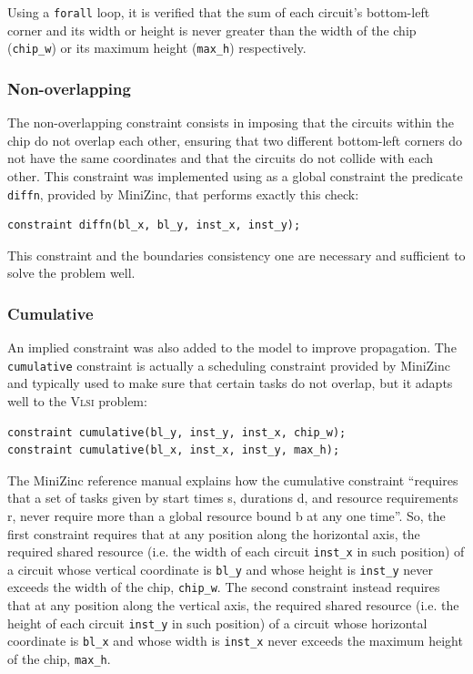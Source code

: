 \documentclass[a4paper, 12pt]{article}
\begin{document}
 Using a \verb|forall| loop, it is verified that the sum of each circuit's bottom-left corner and its width or height is never greater than the width of the chip (\verb|chip_w|) or its maximum height (\verb|max_h|) respectively.


\subsubsection{Non-overlapping}
The non-overlapping constraint consists in imposing that the circuits within the chip do not overlap each other, ensuring that two different bottom-left corners do not have the same coordinates and that the circuits do not collide with each other. This constraint was implemented using as a global constraint the predicate \verb|diffn|, provided by MiniZinc, that performs exactly this check:
\begin{verbatim}
constraint diffn(bl_x, bl_y, inst_x, inst_y);
 \end{verbatim}

This constraint and the boundaries consistency one are necessary and sufficient to solve the problem well.

\subsubsection{Cumulative}
An implied constraint was also added to the model to improve propagation. The \verb|cumulative| constraint is actually a scheduling constraint provided by MiniZinc and typically used to make sure that certain tasks do not overlap, but it adapts well to the \textsc{Vlsi} problem:
\begin{verbatim}
constraint cumulative(bl_y, inst_y, inst_x, chip_w);
constraint cumulative(bl_x, inst_x, inst_y, max_h);
 \end{verbatim}
 
The MiniZinc reference manual explains how the cumulative constraint ``requires that a set of tasks given by start times s, durations d, and resource requirements r, never require more than a global resource bound b at any one time''. So, the first constraint requires that at any position along the horizontal axis, the required shared resource (i.e. the width of each circuit \verb|inst_x| in such position) of a circuit whose vertical coordinate is \verb|bl_y| and whose height is \verb|inst_y| never exceeds the width of the chip, \verb|chip_w|. The second constraint instead requires that at any position along the vertical axis, the required shared resource (i.e. the height of each circuit \verb|inst_y| in such position) of a circuit whose horizontal coordinate is \verb|bl_x| and whose width is \verb|inst_x| never exceeds the maximum height of the chip, \verb|max_h|.
\end{document}
